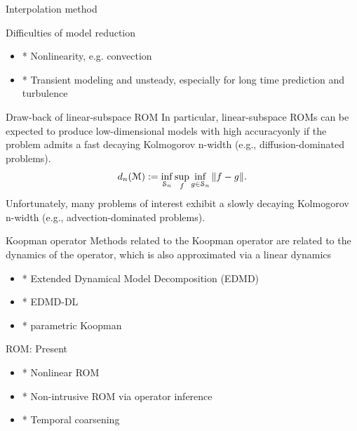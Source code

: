 \documentclass{beamer}
\begin{document}
\begin{frame}{Interpolation method}
	\footnotemark
\end{frame}

\begin{frame}{Difficulties of model reduction}
	\begin{itemize}
		\item * Nonlinearity, e.g. convection
		\item * Transient modeling and unsteady, especially for long time prediction and turbulence
	\end{itemize}
\end{frame}

\begin{frame}{Draw-back of linear-subspace ROM}
	In particular, linear-subspace ROMs can be expected to produce
	low-dimensional models with high accuracy\footnotemark only if the problem admits a fast decaying Kolmogorov n-width
	(e.g., diffusion-dominated problems). 
	\begin{equation}
		d_n(\mathcal{M}) := \inf_{\mathcal{S}_n}\sup_f\inf_{g\in\mathcal{S}_n}\|f-g\|.	
	\end{equation}
	Unfortunately, many problems of interest exhibit a slowly decaying
	Kolmogorov n-width (e.g., advection-dominated problems).
\end{frame}

\begin{frame}{Koopman operator}
	Methods related to the Koopman operator are related to the dynamics of the operator,
	which is also approximated via a linear dynamics 
	\begin{itemize}
		\item * Extended Dynamical Model Decomposition (EDMD)
		\item * EDMD-DL 
		\item * parametric Koopman
	\end{itemize}
\end{frame}

\begin{frame}{ROM: Present}
	\begin{itemize}
		\item * Nonlinear ROM
		\item * Non-intrusive ROM via operator inference
		\item * Temporal coarsening
	\end{itemize}
\end{frame}
\end{document}
